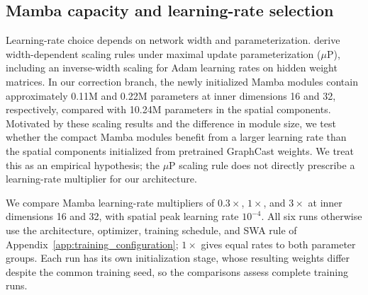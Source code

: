 \documentclass{article}
\newcommand{\vfourchange}[1]{{\color{blue}#1}}
\newif\ifvfivechanges
\begin{document}
\subsection{\texorpdfstring{{Mamba capacity and learning-rate selection}}{Mamba capacity and learning-rate selection}}
\label{sec:training_sensitivity}

{Learning-rate choice depends on network width and parameterization. \citet{yang2022tensorprogramsv} derive width-dependent scaling rules under maximal update parameterization ($\mu$P), including an inverse-width scaling for Adam learning rates on hidden weight matrices. In our correction branch, the newly initialized Mamba modules contain approximately 0.11M and 0.22M parameters at inner dimensions 16 and 32, respectively, compared with 10.24M parameters in the spatial components. Motivated by these scaling results and the difference in module size, we test whether the compact Mamba modules benefit from a larger learning rate than the spatial components initialized from pretrained GraphCast weights. We treat this as an empirical hypothesis; the $\mu$P scaling rule does not directly prescribe a learning-rate multiplier for our architecture.}

\ifvfivechanges
\par\begingroup\color{vfiveDeleted}\noindent
\sout{We compare Mamba learning-rate multipliers of $0.3\times$, $1\times$, and $3\times$ at each inner dimension, holding the spatial peak learning rate fixed at $10^{-4}$. A multiplier of $1\times$ gives equal learning rates to both parameter groups. All six configurations use spatial width 512, one $B,C$ group, batch size four, and AdamW moments $(0.9,0.98)$. Each run has its own 500-update warm-up followed by 2,000 post-warm-up updates, with SWA over post-warm-up updates 500, 1,000, 1,500, and 2,000. The GraphCast backbone remains frozen throughout. Warm-up parameter values differ across runs despite the common training seed, so the comparisons assess complete training runs.}
\par\endgroup
\fi
\vfourchange{We compare Mamba learning-rate multipliers of $0.3\times$, $1\times$, and $3\times$ at inner dimensions 16 and 32, with spatial peak learning rate $10^{-4}$. All six runs otherwise use the architecture, optimizer, training schedule, and SWA rule of Appendix~\ref{app:training_configuration}; $1\times$ gives equal rates to both parameter groups. Each run has its own initialization stage, whose resulting weights differ despite the common training seed, so the comparisons assess complete training runs.}
\end{document}
